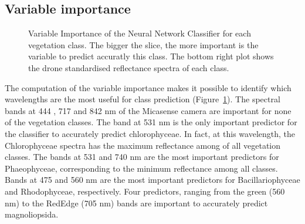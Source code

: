 \documentclass[
  number]{elsarticle}
\begin{document}
\subsection{Variable importance}\label{variable-importance}

\label{cell-fig-VIP}
\begin{figure}[H]


\caption{\label{fig-VIP}Variable Importance of the Neural Network
Classifier for each vegetation class. The bigger the slice, the more
important is the variable to predict accuratly this class. The bottom
right plot shows the drone standardised reflectance spectra of each
class.}

\end{figure}%

The computation of the variable importance makes it possible to identify
which wavelengths are the most useful for class prediction
(Figure~\ref{fig-VIP}). The spectral bands at 444 , 717 and 842 nm of
the Micasense camera are important for none of the vegetation classes.
The band at 531 nm is the only important predictor for the classifier to
accurately predict chlorophyceae. In fact, at this wavelength, the
Chlorophyceae spectra has the maximum reflectance among of all
vegetation classes. The bands at 531 and 740 nm are the most important
predictors for Phaeophyceae, corresponding to the minimum reflectance
among all classes. Bands at 475 and 560 nm are the most important
predictors for Bacillariophyceae and Rhodophyceae, respectively. Four
predictors, ranging from the green (560 nm) to the RedEdge (705 nm)
bands are important to accurately predict magnoliopsida.
\end{document}
